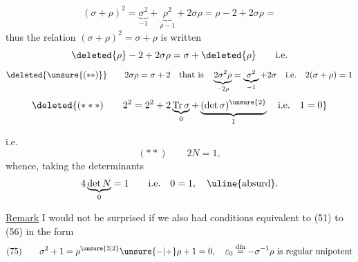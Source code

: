 \[
(\sigma+\rho)^2=\underbrace{\sigma^2}_{-1}+\underbrace{\rho^2}_{\rho-1}+2\sigma\rho=\rho-2+2\sigma\rho=
\]
thus the relation $(\sigma+\rho)^2=\sigma+\rho$ is written
\[
\deleted{\rho}-2+2\sigma\rho=\sigma+\deleted{\rho}\qquad\text{i.e.}
\]
\[
\deleted{\unsure{(**)}}\qquad
2\sigma\rho=\sigma+2\quad\text{that is}\quad
\underbrace{2\sigma^2\rho}_{-2\rho}=\underbrace{\sigma^2}_{-1}+2\sigma
\quad\text{i.e.}\quad 2(\sigma+\rho)=1
\]
\margin{$\Vert$}
\[
\deleted{(***)\qquad 2^2=2^2+2\underbrace{\operatorname{Tr}\sigma}_{0}+\underbrace{(\det\sigma)^{\unsure{2}}}_{1}\quad\text{i.e.}\quad 1=0}
\]

 i.e.
\[
(**)\qquad 2N=1,
\]
whence, taking the determinants
\[
4\underbrace{\det N}_{0}=1\qquad\text{i.e.}\quad 0=1,\quad\text{\uline{absurd}.}
\]

\uline{Remark} I would not be surprised if we also had conditions equivalent to (51) to (56) in the form
\[
(75)\qquad \sigma^2+1=\rho^{\unsure{3|2}}\unsure{-|+}\rho+1=0,\quad
\varepsilon_0\mathrel{\overset{\mathrm{dfn}}{=}}-\sigma^{-1}\rho\ \text{is regular unipotent}
\]

